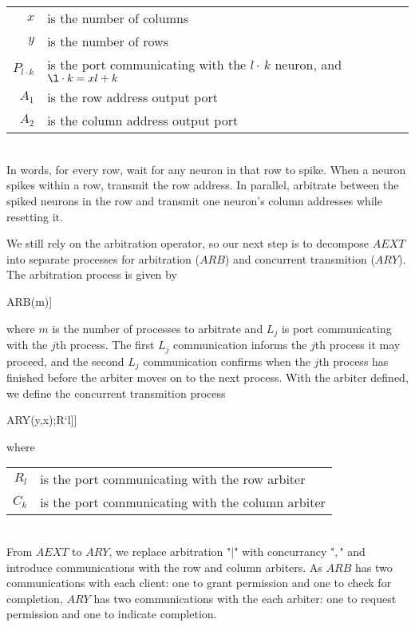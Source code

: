 \documentclass[aer.tex]{subfiles}
\begin{document}
\begin{tabular}[]{rl}
$x$ & is the number of columns \\
$y$ & is the number of rows \\
$P_{l\cdot k}$ & is the port communicating with the $l\cdot\,k$ neuron, and $\l\cdot k=xl+k$  \\
$A_1$ & is the row address output port \\
$A_2$ & is the column address output port \\
\end{tabular} \\

In words, for every row, wait for any neuron in that row to spike.
When a neuron spikes within a row, transmit the row address. In parallel,
arbitrate between the spiked neurons in the row 
and transmit one neuron's column addresses while resetting it.

We still rely on the arbitration operator, 
so our next step is to decompose $AEXT$ into separate processes for 
arbitration ($ARB$) and concurrent transmition ($ARY$). The arbitration process is given by

\begin{csp}
ARB(m)\equiv*[[\langle\|j:1..m:#{L`j}->L`j;L`j\rangle]]
\end{csp}
where $m$ is the number of processes to arbitrate and $L_j$ is port communicating with the $j$th process.
The first $L_j$ communication informs the $j$th process it may proceed, 
and the second $L_j$ communication confirms when the $j$th process has finished 
before the arbiter moves on to the next process. 
With the arbiter defined, we define the concurrent transmition process

\begin{csp}
ARY(y,x)\equiv*[[\langle,l:1..y:\langle|k:1..x:#{P`{l\cdot\,k}}\rangle->R`l;A`1!enc(l)
             ,[\langle,k:1..x:#{P`{l\cdot\,k}}->C`k;A`2!enc(k),P`{l\cdot\,k};C`k\rangle];R`l\rangle]]
\end{csp}
where

\begin{tabular}[]{rl}
$R_l$ & is the port communicating with the row arbiter \\
$C_k$ & is the port communicating with the column arbiter \\
\end{tabular} \\

From $AEXT$ to $ARY$, we replace arbitration "$\vert$" with concurrancy "$,$" and
introduce communications with the row and column arbiters.
As $ARB$ has two communications with each client: one to grant permission and one to check for 
completion, $ARY$ has two communications with the each arbiter: one to request permission and
one to indicate completion.
\end{document}
